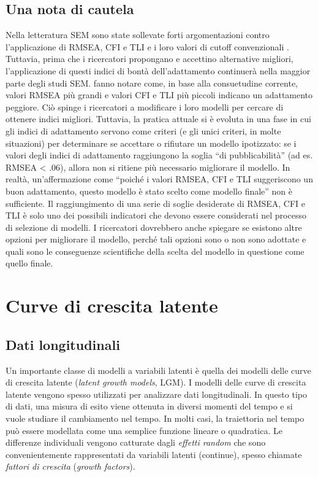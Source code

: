 \documentclass[
  11pt,
]{krantz}
\theoremstyle{definition}
\theoremstyle{definition}
\theoremstyle{definition}
\theoremstyle{definition}
\theoremstyle{remark}
\begin{document}
\hypertarget{una-nota-di-cautela}{%
\section{Una nota di cautela}\label{una-nota-di-cautela}}

Nella letteratura SEM sono state sollevate forti argomentazioni contro l'applicazione di RMSEA, CFI e TLI e i loro valori di cutoff convenzionali \citep[ad esempio,][]{barrett2007structural}. Tuttavia, prima che i ricercatori propongano e accettino alternative migliori, l'applicazione di questi indici di bontà dell'adattamento continuerà nella maggior parte degli studi SEM. \citet{xia2019rmsea} fanno notare come, in base alla consuetudine corrente, valori RMSEA più grandi e valori CFI e TLI più piccoli indicano un adattamento peggiore. Ciò spinge i ricercatori a modificare i loro modelli per cercare di ottenere indici migliori. Tuttavia, la pratica attuale si è evoluta in una fase in cui gli indici di adattamento servono come criteri (e gli unici criteri, in molte situazioni) per determinare se accettare o rifiutare un modello ipotizzato: se i valori degli indici di adattamento raggiungono la soglia ``di pubblicabilità'' (ad es. RMSEA \textless{} .06), allora non si ritiene più necessario migliorare il modello. In realtà, un'affermazione come ``poiché i valori RMSEA, CFI e TLI suggeriscono un buon adattamento, questo modello è stato scelto come modello finale'' non è sufficiente. Il raggiungimento di una serie di soglie desiderate di RMSEA, CFI e TLI è solo uno dei possibili indicatori che devono essere considerati nel processo di selezione di modelli. I ricercatori dovrebbero anche spiegare se esistono altre opzioni per migliorare il modello, perché tali opzioni sono o non sono adottate e quali sono le conseguenze scientifiche della scelta del modello in questione come quello finale.

\hypertarget{ch:growth_models}{%
\chapter{Curve di crescita latente}\label{ch:growth_models}}

\hypertarget{dati-longitudinali}{%
\section{Dati longitudinali}\label{dati-longitudinali}}

Un importante classe di modelli a variabili latenti è quella dei modelli delle curve di crescita latente (\emph{latent growth models}, LGM). I modelli delle curve di crescita latente vengono spesso utilizzati per analizzare dati longitudinali. In questo tipo di dati, una misura di esito viene ottenuta in diversi momenti del tempo e si vuole studiare il cambiamento nel tempo. In molti casi, la traiettoria nel tempo può essere modellata come una semplice funzione lineare o quadratica. Le differenze individuali vengono catturate dagli \emph{effetti random} che sono convenientemente rappresentati da variabili latenti (continue), spesso chiamate \emph{fattori di crescita} (\emph{growth factors}).
\end{document}
